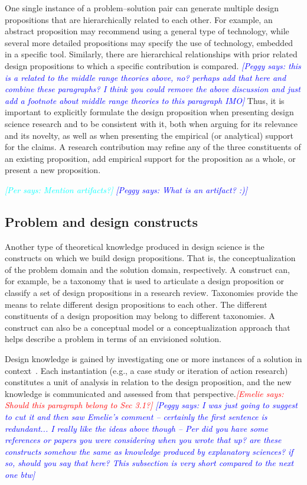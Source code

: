 \documentclass[graybox]{svmult}
\newcommand{\emelie}[1]{\textcolor{red}{{\it [Emelie says: #1]}}}
\newcommand{\peggy}[1]{\textcolor{blue}{{\it [Peggy says: #1]}}}
\newcommand{\per}[1]{\textcolor{cyan}{{\it [Per says: #1]}}}
\newcommand{\emelie}[1]{}
\newcommand{\peggy}[1]{}
\newcommand{\per}[1]{}
\begin{document}
One single instance of a problem--solution pair can generate multiple design propositions that are hierarchically related to each other. For example, an abstract proposition may recommend using a general type of technology, while several more detailed propositions may specify the use of technology, embedded in a specific tool. Similarly, there are hierarchical relationships with prior related design propositions to which a specific contribution is compared.
\peggy{this is a related to the middle range theories above, no?  perhaps add that here and combine these paragraphs?  I think you could remove the above discussion and just add a footnote about middle range theories to this paragraph IMO}
Thus, it is important to explicitly formulate the design proposition when presenting design science research and to be consistent with it, both when arguing for its relevance and its novelty, as well as when presenting the empirical (or analytical) support for the claims. A research contribution may refine any of the three constituents of an existing proposition, add empirical support for the proposition as a whole, or present a new proposition.

\per{Mention artifacts?}
\peggy{What is an artifact? :)}



\subsection{Problem and design constructs}
\label{sec:constructs}
Another type of theoretical knowledge produced in design science is the 
constructs on which we build design propositions. That is, the conceptualization of the problem domain and the solution domain, respectively.  
A construct can, for example, be a taxonomy that is used to articulate a design proposition or classify a set of design propositions in a research review. 
Taxonomies provide the means to relate different design propositions to each other. The different constituents of a design proposition may belong to different taxonomies. A construct can also be a conceptual model or a conceptualization approach that helps describe a problem in terms of an envisioned solution.

Design knowledge is gained by investigating one or more instances of a solution in context~\cite{wieringa_what_2014}. Each instantiation (e.g., a case study or iteration of action research) constitutes a unit of analysis in relation to the design proposition, and the new knowledge is communicated and assessed from that perspective.\emelie{Should this paragraph belong to Sec 3.1?} 
\peggy{I was just going to suggest to cut it and then saw Emelie's comment -- certainly the first sentence is redundant...  I really like the ideas above though -- Per did you have some references or papers you were considering when you wrote that up? are these constructs somehow the same as knowledge produced by explanatory sciences? if so, should you say that here?  This subsection is very short compared to the next one btw}
\end{document}
